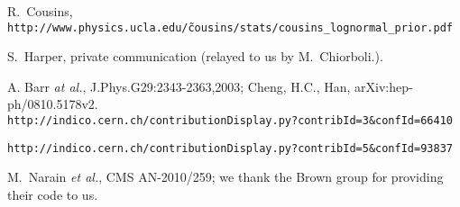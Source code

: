 \begin{thebibliography}{10}
 R.~Cousins, {\tt http://www.physics.ucla.edu/\~cousins/stats/cousins\_lognormal\_prior.pdf}

 S.~Harper, private communication (relayed to us by M.~Chiorboli.).

 A. Barr {\em at al.}, J.Phys.G29:2343-2363,2003;
Cheng, H.C., Han, arXiv:hep-ph/0810.5178v2.\\
{\tt http://indico.cern.ch/contributionDisplay.py?contribId=3\&confId=66410}

 {\tt http://indico.cern.ch/contributionDisplay.py?contribId=5\&confId=93837}

 M.~Narain {\em et al.}, CMS AN-2010/259; we thank the 
Brown group for providing their code to us.


    
\end{thebibliography}
